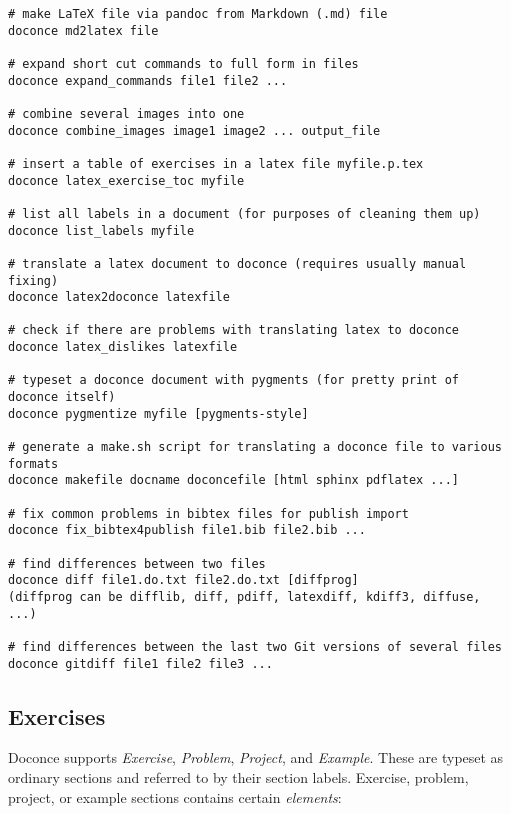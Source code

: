 \documentclass[%
oneside,                 %
final,                   %
10pt]{article}
\begin{document}
\begin{Verbatim}[numbers=none,fontsize=\fontsize{9pt}{9pt},baselinestretch=0.85,xleftmargin=0mm]
# make LaTeX file via pandoc from Markdown (.md) file
doconce md2latex file

# expand short cut commands to full form in files
doconce expand_commands file1 file2 ...

# combine several images into one
doconce combine_images image1 image2 ... output_file

# insert a table of exercises in a latex file myfile.p.tex
doconce latex_exercise_toc myfile

# list all labels in a document (for purposes of cleaning them up)
doconce list_labels myfile

# translate a latex document to doconce (requires usually manual fixing)
doconce latex2doconce latexfile

# check if there are problems with translating latex to doconce
doconce latex_dislikes latexfile

# typeset a doconce document with pygments (for pretty print of doconce itself)
doconce pygmentize myfile [pygments-style]

# generate a make.sh script for translating a doconce file to various formats
doconce makefile docname doconcefile [html sphinx pdflatex ...]

# fix common problems in bibtex files for publish import
doconce fix_bibtex4publish file1.bib file2.bib ...

# find differences between two files
doconce diff file1.do.txt file2.do.txt [diffprog]
(diffprog can be difflib, diff, pdiff, latexdiff, kdiff3, diffuse, ...)

# find differences between the last two Git versions of several files
doconce gitdiff file1 file2 file3 ...
\end{Verbatim}

\subsection{Exercises}

Doconce supports \emph{Exercise}, \emph{Problem}, \emph{Project}, and \emph{Example}.
These are typeset
as ordinary sections and referred to by their section labels.
Exercise, problem, project, or example sections contains certain \emph{elements}:
\end{document}
